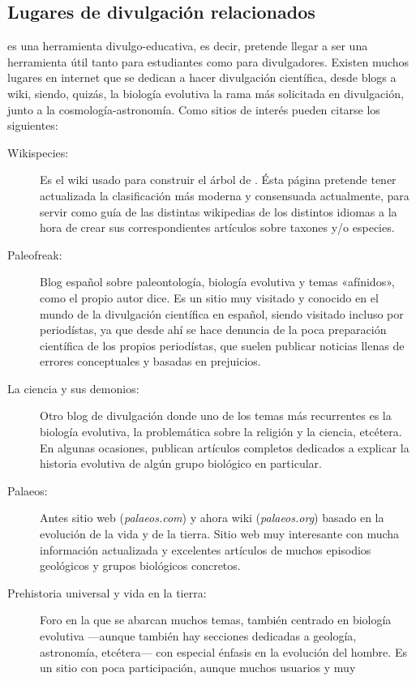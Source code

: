 \subsection{Lugares de divulgación relacionados}
\fpt es una herramienta divulgo-educativa, es decir, pretende llegar a
ser una herramienta útil tanto para estudiantes como para
divulgadores. Existen muchos lugares en internet que se dedican a
hacer divulgación científica, desde blogs a wiki, siendo, quizás, la
biología evolutiva la rama más solicitada en divulgación, junto a la
cosmología-astronomía. Como sitios de interés pueden citarse los
siguientes:

\begin{description}
\item[Wikispecies:] Es el wiki usado para construir el árbol de
  \fpt. Ésta página pretende tener actualizada la clasificación más
  moderna y consensuada actualmente, para servir como guía de las
  distintas wikipedias de los distintos idiomas a la hora de crear sus
  correspondientes artículos sobre taxones y/o especies.
\item[Paleofreak:] Blog español sobre paleontología, biología
  evolutiva y temas «afínidos», como el propio autor dice. Es un sitio
  muy visitado y conocido en el mundo de la divulgación científica en
  español, siendo visitado incluso por periodístas, ya que desde ahí
  se hace denuncia de la poca preparación científica de los propios
  periodístas, que suelen publicar noticias llenas de errores
  conceptuales y basadas en prejuicios.
\item[La ciencia y sus demonios:] Otro blog de divulgación donde uno
  de los temas más recurrentes es la biología evolutiva, la
  problemática sobre la religión y la ciencia, etcétera. En algunas
  ocasiones, publican artículos completos dedicados a explicar la
  historia evolutiva de algún grupo biológico en particular.
\item[Palaeos:] Antes sitio web (\textit{palaeos.com}) y ahora wiki
  (\textit{palaeos.org}) basado en la evolución de la vida y de la
  tierra. Sitio web muy interesante con mucha información actualizada
  y excelentes artículos de muchos episodios geológicos y grupos
  biológicos concretos.
\item[Prehistoria universal y vida en la tierra:] Foro en la que se
  abarcan muchos temas, también centrado en biología evolutiva \----aunque
  también hay secciones dedicadas a geología, astronomía,
  etcétera\---- con especial énfasis en la evolución del hombre. Es un
  sitio con poca participación, aunque muchos usuarios y muy

\end{description}
